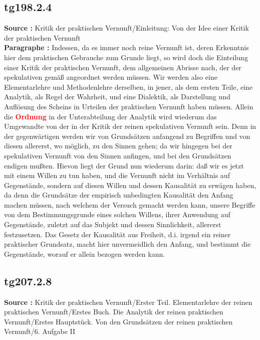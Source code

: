 \documentclass[a4paper,12pt,twoside]{book}
\newcommand{\match}[1]{\textcolor{red}{\textbf{#1}}}
\begin{document}
	\subsection*{tg198.2.4} 
	\textbf{Source : }Kritik der praktischen Vernunft/Einleitung: Von der Idee einer Kritik der praktischen Vernunft\\  
	
	\noindent\textbf{Paragraphe : }Indessen, da es immer noch reine Vernunft ist, deren Erkenntnis hier dem praktischen Gebrauche zum Grunde liegt, so wird doch die Einteilung einer Kritik der praktischen Vernunft, dem allgemeinen Abrisse nach, der der spekulativen gemäß angeordnet werden müssen. Wir werden also eine Elementarlehre und Methodenlehre derselben, in jener, als dem ersten Teile, eine Analytik, als Regel der Wahrheit, und eine Dialektik, als Darstellung und Auflösung des Scheins in Urteilen der praktischen Vernunft haben müssen. Allein die \match{Ordnung} in der Unterabteilung der Analytik wird wiederum das Umgewandte von der in der Kritik der reinen spekulativen Vernunft sein. Denn in der gegenwärtigen werden wir von Grundsätzen anfangend zu Begriffen und von diesen allererst, wo möglich, zu den Sinnen gehen; da wir hingegen bei der spekulativen Vernunft von den Sinnen anfingen, und bei den Grundsätzen endigen mußten. Hievon liegt der Grund nun wiederum darin: daß wir es jetzt mit einem Willen zu tun haben, und die Vernunft nicht im Verhältnis auf Gegenstände, sondern auf diesen Willen und dessen Kausalität zu erwägen haben, da denn die Grundsätze der empirisch unbedingten Kausalität den Anfang machen müssen, nach welchem der Versuch gemacht werden kann, unsere Begriffe von dem Bestimmungsgrunde eines solchen Willens, ihrer Anwendung auf Gegenstände, zuletzt auf das Subjekt und dessen Sinnlichkeit, allererst festzusetzen. Das Gesetz der Kausalität aus Freiheit, d.i. irgend ein reiner praktischer Grundsatz, macht hier unvermeidlich den Anfang, und bestimmt die Gegenstände, worauf er allein bezogen werden kann. 
	
	\subsection*{tg207.2.8} 
	\textbf{Source : }Kritik der praktischen Vernunft/Erster Teil. Elementarlehre der reinen praktischen Vernunft/Erstes Buch. Die Analytik der reinen praktischen Vernunft/Erstes Hauptstück. Von den Grundsätzen der reinen praktischen Vernunft/6. Aufgabe II\\  
	
\end{document}
